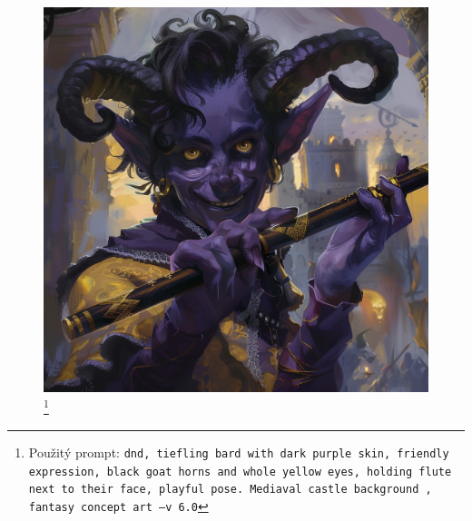 \begin{figure}[h]
  \begin{minipage}{\textwidth}
    \centering
    \includegraphics[width=\textwidth]{resources/figures/demonkin-bard.png}
    \caption[Demonkin Bard - jedna z hratelných postav]{\footnote[5]{Použitý prompt: \texttt{dnd, tiefling bard with dark purple skin, friendly expression, black goat horns and whole yellow eyes, holding flute next to their face, playful pose. Mediaval castle background , fantasy concept art --v 6.0}}}
    \label{fig:demonkin-bard}
  \end{minipage}
\end{figure}